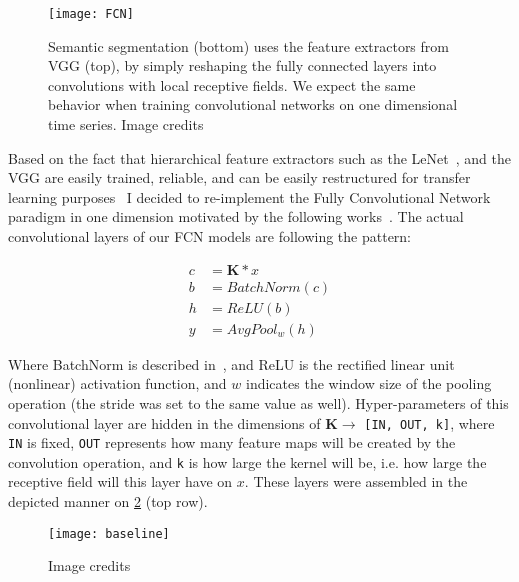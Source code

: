 \begin{figure}
  \centering
  \texttt{[image: FCN]}\label{fig:FCN}
  \caption{Semantic segmentation (bottom) uses the feature extractors from VGG (top), by simply reshaping the fully connected layers into convolutions with local receptive fields. We expect the same behavior when training convolutional networks on one dimensional time series. Image credits~\cite{Long_2015_CVPR}}
\end{figure}

Based on the fact that hierarchical feature extractors such as the LeNet~\cite{lecun1995convolutional}, and the VGG\cite{VGG} are easily trained, reliable, and can be easily restructured for transfer learning purposes~\cite{transfer learning} I decided to re-implement the Fully Convolutional Network~\cite{Long_2015_CVPR} paradigm in one dimension motivated by the following works~\cite{mittelman2015time, langkvist2014review}.
The actual convolutional layers of our FCN models are following the pattern:
\begin{center}
  \begin{equation}
    \begin{split}
      c &= \mathbf{K} \ast x\\
      b &= BatchNorm(c)\\
      h &= ReLU(b)\\
      y &= AvgPool_w(h)
    \end{split}
  \end{equation}
\end{center}

Where BatchNorm is described in~\cite{batchnorm}, and ReLU is the rectified linear unit (nonlinear) activation function, and $w$ indicates the window size of the pooling operation (the stride was set to the same value as well).
Hyper-parameters of this convolutional layer are hidden in the dimensions of  $\mathbf{K}\rightarrow$ \texttt{[IN, OUT, k]}, where \texttt{IN} is fixed, \texttt{OUT} represents how many feature maps will be created by the convolution operation, and \texttt{k} is how large the kernel will be, i.e. how large the receptive field will this layer have on $x$.
These layers were assembled in the depicted manner on \ref{fig:baseline} (top row).

\begin{figure}
  \centering
  \texttt{[image: baseline]}\label{fig:baseline}
  \caption{Image credits~\cite{wang2016time}}
\end{figure}

